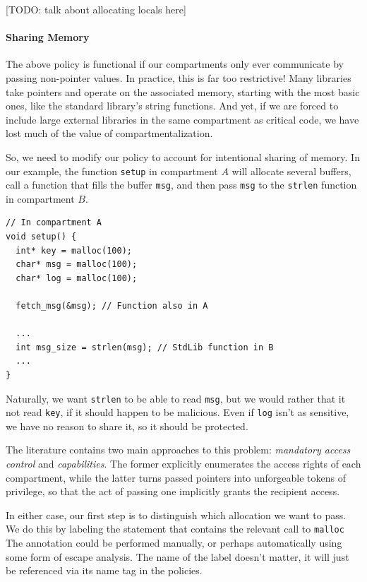 \documentclass[acmsmall,review,anonymous]{acmart}\settopmatter{printfolios=true,printccs=false,printacmref=false}
\begin{document}
[TODO: talk about allocating locals here]

\paragraph{Sharing Memory}

The above policy is functional if our compartments only ever communicate by passing
non-pointer values. In practice, this is far too restrictive! Many libraries take pointers
and operate on the associated memory, starting with the most basic ones, like the
standard library's string functions. And yet, if we are forced to include large
external libraries in the same compartment as critical code, we have lost much of
the value of compartmentalization.

So, we need to modify our policy to account for intentional sharing of memory.
In our example, the function {\tt setup} in compartment \(A\) will allocate several
buffers, call a function that fills the buffer {\tt msg}, and then pass {\tt msg}
to the {\tt strlen} function in compartment \(B\).

\begin{verbatim}
// In compartment A
void setup() {
  int* key = malloc(100);
  char* msg = malloc(100);
  char* log = malloc(100);

  fetch_msg(&msg); // Function also in A

  ...
  int msg_size = strlen(msg); // StdLib function in B
  ...
}
\end{verbatim}

Naturally, we want {\tt strlen} to be able to read {\tt msg}, but we would
rather that it not read {\tt key}, if it should happen to be malicious.
Even if {\tt log} isn't as sensitive, we have no reason to share it, so
it should be protected.

The literature contains two main approaches to this problem:
{\em mandatory access control} and {\em capabilities}. The former explicitly
enumerates the access rights of each compartment, while the latter turns passed
pointers into unforgeable tokens of privilege, so that the act of passing one
implicitly grants the recipient access.

In either case, our first step is to distinguish which allocation we want to pass.
We do this by labeling the statement that contains the relevant call to {\tt malloc}
The annotation could be performed manually, or perhaps automatically using some form
of escape analysis. The name of the label doesn't matter, it will just be referenced
via its name tag in the policies.
\end{document}

